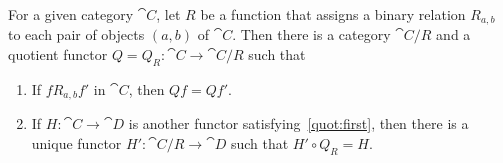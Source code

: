 \begin{proposition}
    For a given category $\cat{C}$, let $R$ be a function that assigns a binary relation $R_{a,b}$ to each pair of objects $(a,b)$ of $\cat{C}$.
    Then there is a category $\cat{C}/R$ and a quotient functor $Q=Q_R: \cat{C} \rightarrow \cat{C}/R$ such that
    \begin{enumerate}[label=(\roman*)]
        \item \label{quot:first} If $f R_{a,b} f'$ in $\cat{C}$, then $Qf = Qf'$.
        \item If $H: \cat{C} \rightarrow \cat{D}$ is another functor satisfying~\ref{quot:first}, then there is a unique functor $H': \cat{C}/R \rightarrow \cat{D}$ such that $H' \circ Q_R = H$.
    \end{enumerate}
\end{proposition}